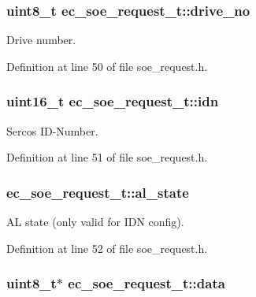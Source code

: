 \subsubsection[{drive\-\_\-no}]{\setlength{\rightskip}{0pt plus 5cm}uint8\-\_\-t ec\-\_\-soe\-\_\-request\-\_\-t\-::drive\-\_\-no}\label{structec__soe__request__t_a041ffd0bc617403520b352bcb347a6b5}


Drive number. 



Definition at line 50 of file soe\-\_\-request.\-h.

\subsubsection[{idn}]{\setlength{\rightskip}{0pt plus 5cm}uint16\-\_\-t ec\-\_\-soe\-\_\-request\-\_\-t\-::idn}\label{structec__soe__request__t_a04792e875a94787c20bb370e65b584b7}


Sercos I\-D-\/\-Number. 



Definition at line 51 of file soe\-\_\-request.\-h.

\subsubsection[{al\-\_\-state}]{ ec\-\_\-soe\-\_\-request\-\_\-t\-::al\-\_\-state}\label{structec__soe__request__t_aa421217a4fc552dc2411b07010a4520a}


A\-L state (only valid for I\-D\-N config). 



Definition at line 52 of file soe\-\_\-request.\-h.

\subsubsection[{data}]{\setlength{\rightskip}{0pt plus 5cm}uint8\-\_\-t$\ast$ ec\-\_\-soe\-\_\-request\-\_\-t\-::data}\label{structec__soe__request__t_a50146c3d308515d01b221f17b528f2f7}


